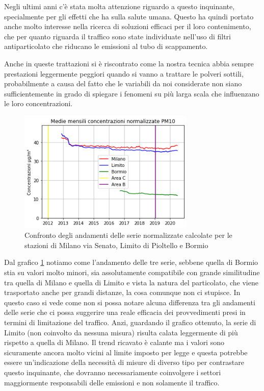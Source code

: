 \documentclass[a4paper]{report}
\begin{document}
Negli ultimi anni c'è stata molta attenzione riguardo a questo inquinante, specialmente per gli effetti che ha sulla salute umana.
Questo ha quindi portato anche molto interesse nella ricerca di soluzioni efficaci per il loro contenimento, che per quanto riguarda il traffico sono state individuate nell'uso di filtri antiparticolato che riducano le emissioni al tubo di scappamento. 

Anche in queste trattazioni si è riscontrato come la nostra tecnica abbia sempre prestazioni leggermente peggiori quando si vanno a trattare le polveri sottili, probabilmente a causa del fatto che le variabili da noi considerate non siano sufficientemente in grado di spiegare i fenomeni su più larga scala che influenzano le loro concentrazioni.

\begin{figure}[h]
\centering
\includegraphics[width=0.75\textwidth]{pm10_traffico}
\caption{Confronto degli andamenti delle serie normalizzate calcolate per le stazioni di Milano via Senato, Limito di Pioltello e Bormio}
\label{fig:pm10_traffico}
\end{figure}

Dal grafico \ref{fig:pm10_traffico} notiamo come l'andamento delle tre serie, sebbene quella di Bormio stia su valori molto minori, sia assolutamente compatibile con grande similitudine tra quella di Milano e quella di Limito e vista la natura del particolato, che viene trasportato anche per grandi distanze, la cosa comunque non ci stupisce. In questo caso si vede come non si possa notare alcuna differenza tra gli andamenti delle serie che ci possa suggerire una reale efficacia dei provvedimenti presi in termini di limitazione del traffico. Anzi, guardando il grafico ottenuto, la serie di Limito (non coinvolto da nessuna misura) risulta calata leggermente di più rispetto a quella di Milano.
Il trend ricavato è calante ma i valori sono sicuramente ancora molto vicini al limite imposto per legge e questa potrebbe essere un'indicazione della necessità di misure di diverso tipo per contrastare questo inquinante, che dovranno necessariamente coinvolgere i settori maggiormente responsabili delle emissioni e non solamente il traffico.
\end{document}
